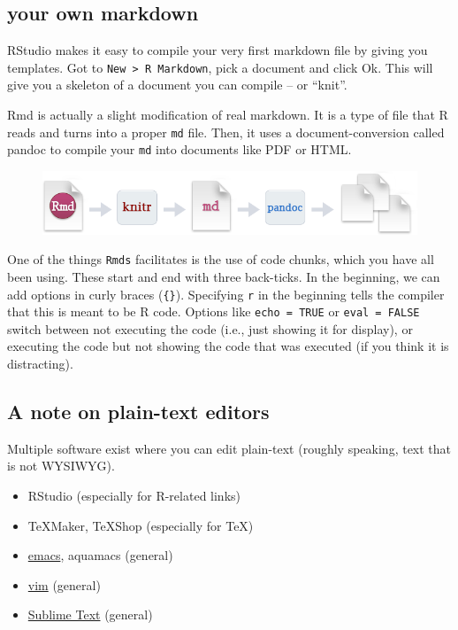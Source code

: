 \documentclass[]{book}
\providecommand{\tightlist}{%
  \setlength{\itemsep}{0pt}\setlength{\parskip}{0pt}}
\theoremstyle{definition}
\theoremstyle{definition}
\theoremstyle{definition}
\theoremstyle{remark}
\begin{document}
\subsection{your own markdown}\label{your-own-markdown}

RStudio makes it easy to compile your very first markdown file by giving
you templates. Got to \texttt{New\ \textgreater{}\ R\ Markdown}, pick a
document and click Ok. This will give you a skeleton of a document you
can compile -- or ``knit''.

Rmd is actually a slight modification of real markdown. It is a type of
file that R reads and turns into a proper \texttt{md} file. Then, it
uses a document-conversion called pandoc to compile your \texttt{md}
into documents like PDF or HTML.

\begin{figure}
\centering
\includegraphics{RMarkdownFlow.png}
\caption{}
\end{figure}

One of the things \texttt{Rmds} facilitates is the use of code chunks,
which you have all been using. These start and end with three
back-ticks. In the beginning, we can add options in curly braces
(\texttt{\{\}}). Specifying \texttt{r} in the beginning tells the
compiler that this is meant to be R code. Options like
\texttt{echo\ =\ TRUE} or \texttt{eval\ =\ FALSE} switch between not
executing the code (i.e., just showing it for display), or executing the
code but not showing the code that was executed (if you think it is
distracting).

\subsection{A note on plain-text
editors}\label{a-note-on-plain-text-editors}

Multiple software exist where you can edit plain-text (roughly speaking,
text that is not WYSIWYG).

\begin{itemize}
\tightlist
\item
  RStudio (especially for R-related links)
\item
  TeXMaker, TeXShop (especially for TeX)
\item
  \href{https://www.gnu.org/software/emacs/}{emacs}, aquamacs (general)
\item
  \href{http://www.vim.org/download.php}{vim} (general)
\item
  \href{https://www.sublimetext.com}{Sublime Text} (general)
\end{itemize}
\end{document}
